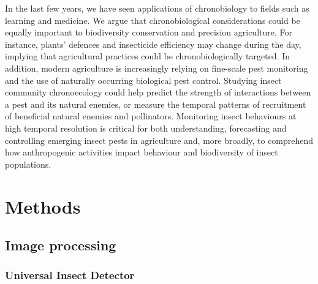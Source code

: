 \documentclass[12pt]{article}
\begin{document}
\begin{linenumbers}
		
		In the last few years, we have seen applications of chronobiology to fields such as learning\cite{smarr_time_2014} and medicine\cite{cederroth_medicine_2019}. We argue that chronobiological considerations could be equally important to biodiversity conservation and precision agriculture\cite{gottlieb_agro-chronobiology_2019,karapetyan_redox_2018,khyati_insect_2017}. For instance, plants’ defences\cite{goodspeed_arabidopsis_2012,jander_timely_2012} and insecticide efficiency\cite{balmert_time--day_2014,khalid_circadian_2019} may change during the day, implying that agricultural practices could be chronobiologically targeted. In addition, modern agriculture is increasingly relying on fine-scale pest monitoring and the use of naturally occurring biological pest control\cite{gagic_better_2021,tooker_balancing_2020}. Studying insect community chronoecology could help predict the strength of interactions between a pest and its natural enemies, or measure the temporal patterns of recruitment of beneficial natural enemies and pollinators. Monitoring insect behaviours at high temporal resolution is critical for both understanding, forecasting and controlling emerging insect pests in agriculture and, more broadly, to comprehend how anthropogenic activities impact behaviour and biodiversity of insect populations.
		
		\section*{Methods}
		
		
		\subsection*{Image processing}
		
		\subsubsection*{Universal Insect Detector}

\end{linenumbers}
\end{document}
